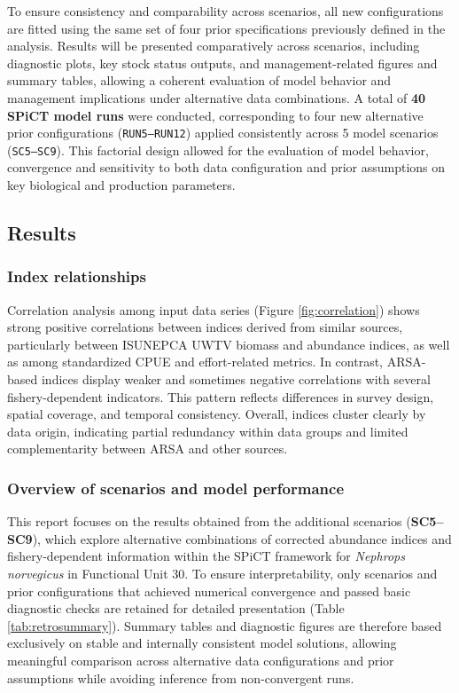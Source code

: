 \documentclass[
  12pt,
]{article}
\begin{document}
To ensure consistency and comparability across scenarios, all new configurations are fitted using the same set of four prior specifications previously defined in the analysis. Results will be presented comparatively across scenarios, including diagnostic plots, key stock status outputs, and management-related figures and summary tables, allowing a coherent evaluation of model behavior and management implications under alternative data combinations. A total of \textbf{40 SPiCT model runs} were conducted, corresponding to four new alternative prior configurations (\texttt{RUN5–RUN12}) applied consistently across 5 model scenarios (\texttt{SC5–SC9}). This factorial design allowed for the evaluation of model behavior, convergence and sensitivity to both data configuration and prior assumptions on key biological and production parameters.

\newpage

\subsection{Results}\label{results}

\subsubsection{Index relationships}\label{index-relationships}

Correlation analysis among input data series (Figure \ref{fig:correlation}) shows strong positive correlations between indices derived from similar sources, particularly between ISUNEPCA UWTV biomass and abundance indices, as well as among standardized CPUE and effort-related metrics. In contrast, ARSA-based indices display weaker and sometimes negative correlations with several fishery-dependent indicators. This pattern reflects differences in survey design, spatial coverage, and temporal consistency. Overall, indices cluster clearly by data origin, indicating partial redundancy within data groups and limited complementarity between ARSA and other sources.

\subsubsection{Overview of scenarios and model performance}\label{overview-of-scenarios-and-model-performance}

This report focuses on the results obtained from the additional scenarios (\textbf{SC5--SC9}), which explore alternative combinations of corrected abundance indices and fishery-dependent information within the SPiCT framework for \emph{Nephrops norvegicus} in Functional Unit 30. To ensure interpretability, only scenarios and prior configurations that achieved numerical convergence and passed basic diagnostic checks are retained for detailed presentation (Table \ref{tab:retrosummary}). Summary tables and diagnostic figures are therefore based exclusively on stable and internally consistent model solutions, allowing meaningful comparison across alternative data configurations and prior assumptions while avoiding inference from non-convergent runs.
\end{document}
